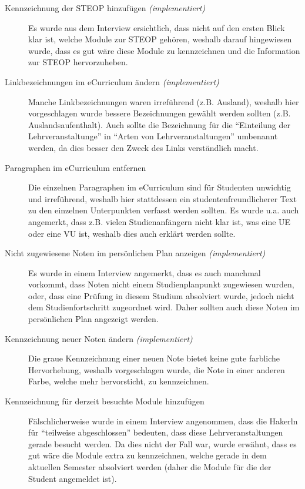 \documentclass[a4paper,10pt]{scrartcl}
\begin{document}
\begin{description}
\item[Kennzeichnung der STEOP hinzufügen \textit{(implementiert)}] 
Es wurde aus dem Interview ersichtlich, dass nicht auf den ersten Blick klar ist, welche Module zur STEOP gehören, weshalb darauf hingewiesen wurde, dass es gut wäre diese Module zu kennzeichnen und die Information zur STEOP hervorzuheben.
 
\item[Linkbezeichnungen im eCurriculum ändern \textit{(implementiert)}] 
Manche Linkbezeichnungen waren irreführend (z.B. Ausland), weshalb hier vorgeschlagen wurde bessere Bezeichnungen gewählt werden sollten (z.B. Auslandsaufenthalt).
Auch sollte die Bezeichnung für die ``Einteilung der Lehrveranstaltunge'' in ``Arten von Lehrveranstaltungen'' umbenannt werden, da dies besser den Zweck des Links verständlich macht.

\item[Paragraphen im eCurriculum entfernen] 
Die einzelnen Paragraphen im eCurriculum sind für Studenten unwichtig und irreführend, weshalb hier stattdessen ein studentenfreundlicherer Text zu den einzelnen Unterpunkten verfasst werden sollten. Es wurde u.a. auch angemerkt, dass z.B. vielen Studienanfängern nicht klar ist, was eine UE oder eine VU ist, weshalb dies auch erklärt werden sollte.
 
\item[Nicht zugewiesene Noten im persönlichen Plan anzeigen \textit{(implementiert)}] Es wurde in einem Interview angemerkt, dass es auch manchmal vorkommt, dass Noten nicht einem Studienplanpunkt zugewiesen wurden, oder, dass eine Prüfung in diesem
Studium absolviert wurde, jedoch nicht dem Studienfortschritt zugeordnet wird. Daher sollten auch diese Noten im persönlichen Plan angezeigt werden.

\item[Kennzeichnung neuer Noten ändern \textit{(implementiert)}] 
Die graue Kennzeichnung einer neuen Note bietet keine gute farbliche Hervorhebung, weshalb vorgeschlagen wurde, die Note in einer anderen Farbe, welche mehr hervorsticht, zu kennzeichnen.

\item[Kennzeichnung für derzeit besuchte Module hinzufügen] 
Fälschlicherweise wurde in einem Interview angenommen, dass die Hakerln für ``teilweise abgeschlossen'' bedeuten, dass diese Lehrveranstaltungen gerade besucht werden. Da dies nicht der Fall war, wurde erwähnt, dass es gut wäre die Module extra zu kennzeichnen, welche gerade in dem aktuellen Semester absolviert werden (daher die Module für die der Student angemeldet ist).
 

\end{description}
\end{document}
